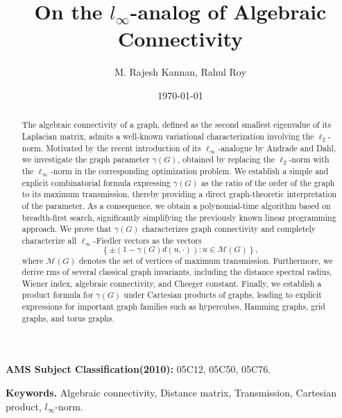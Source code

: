 \documentclass[12pt]{article}
\title{ On the $l_\infty$-analog of Algebraic Connectivity}
\author{ M. Rajesh Kannan,  Rahul Roy}
\date{\today}
\begin{document}
	\maketitle
	\begin{abstract} 
		
		The algebraic connectivity of a graph, defined as the second smallest eigenvalue of its Laplacian matrix, admits a well-known variational characterization involving the $\ell_2$-norm. Motivated by the recent introduction of its $\ell_\infty$-analogue by Andrade and Dahl, we investigate the graph parameter $\gamma(G)$, obtained by replacing the $\ell_2$-norm with the $\ell_\infty$-norm in the corresponding optimization problem. We establish a simple and explicit combinatorial formula expressing $\gamma(G)$ as the ratio of the order of the graph to its maximum transmission, thereby providing a direct graph-theoretic interpretation of the parameter. As a consequence, we obtain a polynomial-time algorithm based on breadth-first search, significantly simplifying the previously known linear programming approach. We prove that $\gamma(G)$ characterizes graph connectivity and completely characterize all $\ell_\infty$-Fiedler vectors as the vectors
		\[
		\left\{\pm\left(1-\gamma(G)d(u,\cdot)\right):u\in \mathcal{M}(G)\right\},
		\]
		where $\mathcal{M}(G)$ denotes the set of vertices of maximum transmission. Furthermore, we derive rms of several classical graph invariants, including the distance spectral radius, Wiener index, algebraic connectivity, and Cheeger constant. Finally, we establish a product formula for $\gamma(G)$ under Cartesian products of graphs, leading to explicit expressions for important graph families such as hypercubes, Hamming graphs, grid graphs, and torus graphs. 
		
		
		
		
	\end{abstract}
	
	{\bf AMS Subject Classification(2010):} 05C12, 05C50, 05C76.
	
	\textbf{Keywords.} Algebraic connectivity, Distance matrix, Transmission, Cartesian product, $l_\infty$-norm.
\end{document}
